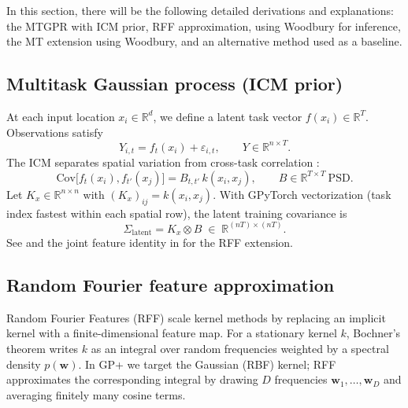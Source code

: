 \documentclass[11pt]{article}
\newcommand{\Sig}{\Sigma}
\begin{document}
In this section, there will be the following detailed derivations and explanations: the MTGPR with ICM prior, RFF approximation, using Woodbury for inference, the MT extension using Woodbury, and an alternative method used as a baseline.

\subsection{Multitask Gaussian process (ICM prior)}
\label{sec:icm}

At each input location $x_i \in \mathbb{R}^d$, we define a latent task vector $f(x_i) \in \mathbb{R}^T$.
Observations satisfy
\begin{equation}
  \label{eq:obs-model}
  Y_{i,t} = f_t(x_i) + \varepsilon_{i,t},
  \qquad
  Y \in \mathbb{R}^{n \times T}.
\end{equation}
The ICM separates spatial variation from cross-task correlation
\citep{bonilla2008mtgp,alvarez2012kernels}:
\begin{equation}
  \label{eq:icm-element}
  \mathrm{Cov}\bigl[f_t(x_i), f_{t'}(x_j)\bigr]
  = B_{t,t'}\, k(x_i, x_j),
  \qquad
  B \in \mathbb{R}^{T \times T}\ \text{PSD}.
\end{equation}
Let $K_x \in \mathbb{R}^{n \times n}$ with $(K_x)_{ij} = k(x_i, x_j)$.
With GPyTorch vectorization (task index fastest within each spatial row),
the latent training covariance is
\begin{equation}
  \label{eq:kron-latent}
  \Sig_{\mathrm{latent}} = K_x \otimes B
  \;\in\; \mathbb{R}^{(nT)\times(nT)}.
\end{equation}
See  and the joint feature identity in  for the RFF extension.


\subsection{Random Fourier feature approximation}
\label{sec:rff}

Random Fourier Features (RFF) \citep{rahimi2007rff} scale kernel methods by replacing an implicit
kernel with a finite-dimensional feature map.
For a stationary kernel $k$, Bochner's theorem writes $k$ as an integral over random frequencies
weighted by a spectral density $p(\mathbf w)$.
In GP+ we target the Gaussian (RBF) kernel; RFF approximates the corresponding integral by drawing
$D$ frequencies $\mathbf w_1,\ldots,\mathbf w_D$ and averaging finitely many cosine terms.
\end{document}
